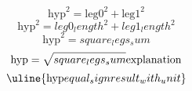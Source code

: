 \[\text{{{hyp}}}^{{2}}=\text{{{leg0}}}^{{2}}+\text{{{leg1}}}^{{2}}\]
\[\text{{{hyp}}}^{{2}}={leg0_length}^{{2}}+{leg1_length}^{{2}}\]
\[\text{{{hyp}}}^{{2}}={square_legs_sum}\]
\[\text{{{hyp}}}=\sqrt{{\mathstrut {square_legs_sum}}}\text{{{explanation}}}\]
\[\uline{{\text{{{hyp}}}{equal_sign}{result_with_unit}}}\]